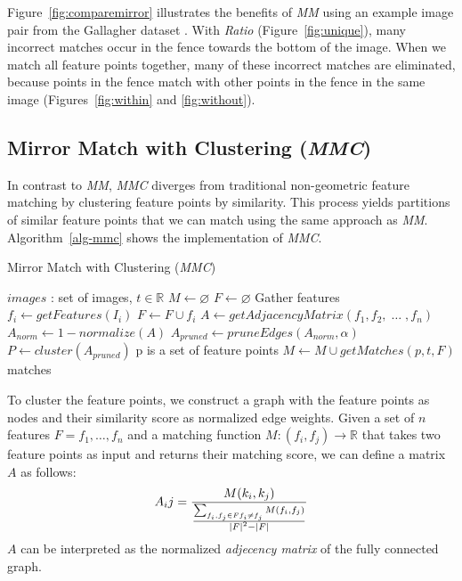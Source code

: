 Figure~\ref{fig:comparemirror} illustrates the benefits of \emph{MM} 
using an example image pair from the Gallagher dataset 
\cite{gallagher2008}.
With \emph{Ratio} (Figure~\ref{fig:unique}), many incorrect matches occur 
in the fence towards the bottom of the image.
When we match all feature points together, many of these incorrect 
matches are eliminated, because points in the fence match with other 
points in the fence in the same image (Figures~\ref{fig:within} and
\ref{fig:without}).


\subsection{Mirror Match with Clustering (\emph{MMC})}

In contrast to \emph{MM}, \emph{MMC} diverges from traditional 
non-geometric feature matching by clustering feature points by 
similarity. This process yields partitions of similar feature points 
that we can match using the same approach as \emph{MM}.  
Algorithm~\ref{alg-mmc} shows the implementation of \emph{MMC}.

\begin{algorithm}[htb]
\caption{Mirror Match with Clustering (\emph{MMC})}
\label{alg-mmc}
\begin{algorithmic}
\Require $images$ : set of images, $t \in \mathbb{R}$
\State $M\gets \varnothing$
\State $F\gets \varnothing$
 \Comment Gather features
	\State $f_i\gets getFeatures(I_i)$
	\State $F\gets F \cup f_i$
\EndFor
\State $A\gets getAdjacencyMatrix(f_1, f_2,\; \ldots \;, f_n)$
\State $A_{norm}\gets 1 - normalize(A)$
\State $A_{pruned}\gets pruneEdges(A_{norm},\alpha)$
\State $P\gets cluster(A_{pruned})$
 \Comment p is a set of feature points
	\State $M\gets M \cup getMatches(p, t, F)$
\EndFor \\
\Return matches
\end{algorithmic}
\end{algorithm}

To cluster the feature points, we construct a graph with the feature 
points as nodes and their similarity score as normalized edge weights.  
Given a set of $n$ features $F = {f_1, \ldots, f_n}$ and a matching 
function $M : (f_i, f_j) \rightarrow \mathbb{R}$ that takes two feature 
points as input and returns their matching score, we can define a matrix 
$A$ as follows:
\begin{equation*}
	A_ij = \frac{M(k_i, k_j)}{\frac{\sum_{f_i,f_j \in F\\f_i \neq f_j} 
	M(f_i, f_j)}{\left\vert F \right\vert ^ {2} - \left\vert F 
\right\vert}}
\end{equation*}
$A$ can be interpreted as the normalized \emph{adjecency matrix} of the 
fully connected graph.  

